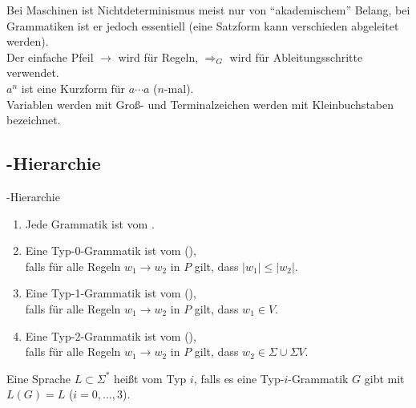 \begin{Bem}
    Bei Maschinen ist Nichtdeterminismus meist nur von "`akademischem"'
    Belang, bei Grammatiken ist er jedoch essentiell
    (eine Satzform kann verschieden abgeleitet werden).\\
    Der einfache Pfeil $\rightarrow$ wird für Regeln,
    $\Rightarrow_G$ wird für Ableitungsschritte verwendet.\\
    $a^n$ ist eine Kurzform für $a \dotsb a$ ($n$-mal).\\
    Variablen werden mit Groß- und
    Terminalzeichen werden mit Kleinbuchstaben bezeichnet.
\end{Bem}

\subsection{%
    -Hierarchie%
}

\begin{Def}{-Hierarchie}
    \begin{enumerate}[label=\emph{Typ \arabic*}:,start=0,
                      leftmargin=20mm,labelsep=5mm]
        \item
        Jede Grammatik ist vom .
        
        \item
        Eine Typ-0-Grammatik ist vom 
        (),\\
        falls für alle Regeln $w_1 \rightarrow w_2$ in $P$
        gilt, dass $|w_1| \le |w_2|$.
        
        \item
        Eine Typ-1-Grammatik ist vom 
        (),\\
        falls für alle Regeln $w_1 \rightarrow w_2$ in $P$
        gilt, dass $w_1 \in V$.
        
        \item
        Eine Typ-2-Grammatik ist vom 
        (),\\
        falls für alle Regeln $w_1 \rightarrow w_2$ in $P$
        gilt, dass $w_2 \in \Sigma \cup \Sigma V$.
    \end{enumerate}
    Eine Sprache $L \subset \Sigma^\ast$ heißt
    vom Typ $i$, falls es eine Typ-$i$-Grammatik $G$ gibt mit $L(G) = L$
    ($i = 0, \dotsc, 3$).
\end{Def}

